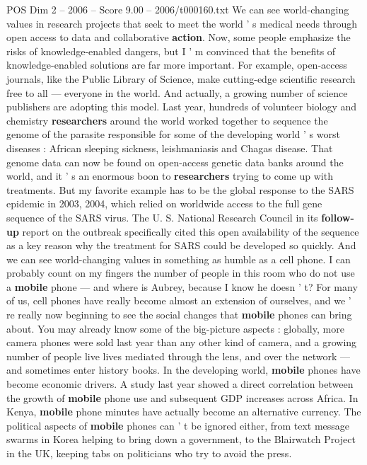 \begin{textsample}{POS Dim 2 – 2006 – Score 9.00 – 2006/t000160.txt}
We can see world-changing values in research projects that seek to meet the world ' s medical needs through open access to data and collaborative \textbf{action}.
Now, some people emphasize the risks of knowledge-enabled dangers, but I ' m convinced that the benefits of knowledge-enabled solutions are far more important.
For example, open-access journals, like the Public Library of Science, make cutting-edge scientific research free to all — everyone in the world.
And actually, a growing number of science publishers are adopting this model.
Last year, hundreds of volunteer biology and chemistry \textbf{researchers} around the world worked together to sequence the genome of the parasite responsible for some of the developing world ' s worst diseases : African sleeping sickness, leishmaniasis and Chagas disease.
That genome data can now be found on open-access genetic data banks around the world, and it ' s an enormous boon to \textbf{researchers} trying to come up with treatments.
But my favorite example has to be the global response to the SARS epidemic in 2003, 2004, which relied on worldwide access to the full gene sequence of the SARS virus.
The U.
S.
National Research Council in its \textbf{follow-up} report on the outbreak specifically cited this open availability of the sequence as a key reason why the treatment for SARS could be developed so quickly.
And we can see world-changing values in something as humble as a cell phone.
I can probably count on my fingers the number of people in this room who do not use a \textbf{mobile} phone — and where is Aubrey, because I know he doesn ' t?
For many of us, cell phones have really become almost an extension of ourselves, and we ' re really now beginning to see the social changes that \textbf{mobile} phones can bring about.
You may already know some of the big-picture aspects : globally, more camera phones were sold last year than any other kind of camera, and a growing number of people live lives mediated through the lens, and over the network — and sometimes enter history books.
In the developing world, \textbf{mobile} phones have become economic drivers.
A study last year showed a direct correlation between the growth of \textbf{mobile} phone use and subsequent GDP increases across Africa.
In Kenya, \textbf{mobile} phone minutes have actually become an alternative currency.
The political aspects of \textbf{mobile} phones can ' t be ignored either, from text message swarms in Korea helping to bring down a government, to the Blairwatch Project in the UK, keeping tabs on politicians who try to avoid the press.

\end{textsample}
